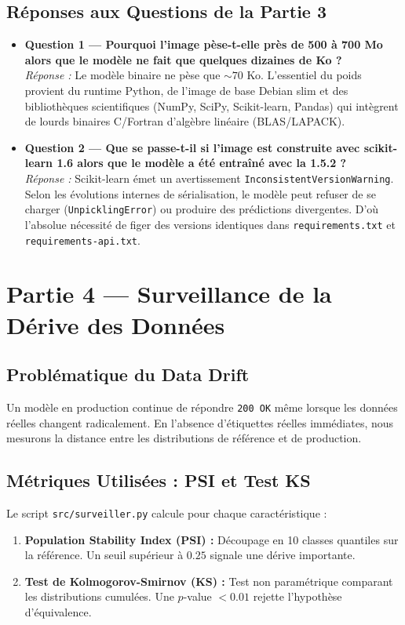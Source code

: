 \documentclass[12pt,a4paper]{article}
\begin{document}
\subsection{Réponses aux Questions de la Partie 3}
\begin{itemize}[leftmargin=*]
  \item \textbf{Question 1 — Pourquoi l'image pèse-t-elle près de 500 à 700 Mo alors que le modèle ne fait que quelques dizaines de Ko ?}\\
  \textit{Réponse :} Le modèle binaire ne pèse que $\sim 70$ Ko. L'essentiel du poids provient du runtime Python, de l'image de base Debian slim et des bibliothèques scientifiques (NumPy, SciPy, Scikit-learn, Pandas) qui intègrent de lourds binaires C/Fortran d'algèbre linéaire (BLAS/LAPACK).

  \item \textbf{Question 2 — Que se passe-t-il si l'image est construite avec scikit-learn 1.6 alors que le modèle a été entraîné avec la 1.5.2 ?}\\
  \textit{Réponse :} Scikit-learn émet un avertissement \texttt{InconsistentVersionWarning}. Selon les évolutions internes de sérialisation, le modèle peut refuser de se charger (\texttt{UnpicklingError}) ou produire des prédictions divergentes. D'où l'absolue nécessité de figer des versions identiques dans \texttt{requirements.txt} et \texttt{requirements-api.txt}.
\end{itemize}

\newpage

\section{Partie 4 — Surveillance de la Dérive des Données}

\subsection{Problématique du Data Drift}
Un modèle en production continue de répondre \texttt{200 OK} même lorsque les données réelles changent radicalement. En l'absence d'étiquettes réelles immédiates, nous mesurons la distance entre les distributions de référence et de production.

\subsection{Métriques Utilisées : PSI et Test KS}
Le script \texttt{src/surveiller.py} calcule pour chaque caractéristique :
\begin{enumerate}
  \item \textbf{Population Stability Index (PSI) :} Découpage en 10 classes quantiles sur la référence. Un seuil supérieur à $0.25$ signale une dérive importante.
  \item \textbf{Test de Kolmogorov-Smirnov (KS) :} Test non paramétrique comparant les distributions cumulées. Une $p$-value $< 0.01$ rejette l'hypothèse d'équivalence.
\end{enumerate}
\end{document}
